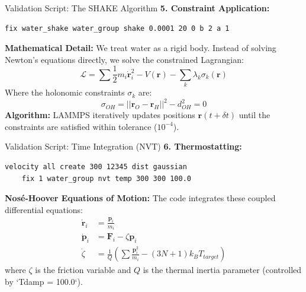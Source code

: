 \documentclass[aspectratio=169, 10pt]{beamer}
\begin{document}
\begin{frame}[fragile]{Validation Script: The SHAKE Algorithm}
    \textbf{5. Constraint Application:}
    \begin{lstlisting}[language=bash]
    fix water_shake water_group shake 0.0001 20 0 b 2 a 1
    \end{lstlisting}
    
    \textbf{Mathematical Detail:}
    We treat water as a rigid body. Instead of solving Newton's equations directly, we solve the constrained Lagrangian:
    \begin{equation}
        \mathcal{L} = \sum \frac{1}{2} m_i \dot{\mathbf{r}}_i^2 - V(\mathbf{r}) - \sum_{k} \lambda_k \sigma_k(\mathbf{r})
    \end{equation}
    Where the holonomic constraints $\sigma_k$ are:
    \begin{equation}
        \sigma_{OH} = ||\mathbf{r}_O - \mathbf{r}_H||^2 - d_{OH}^2 = 0
    \end{equation}
    \textbf{Algorithm:}
    LAMMPS iteratively updates positions $\mathbf{r}(t+\delta t)$ until the constraints are satisfied within tolerance ($10^{-4}$).
\end{frame}

\begin{frame}[fragile]{Validation Script: Time Integration (NVT)}
    \textbf{6. Thermostatting:}
    \begin{lstlisting}[language=bash]
    velocity all create 300 12345 dist gaussian
    fix 1 water_group nvt temp 300 300 100.0
    \end{lstlisting}

    \textbf{Nosé-Hoover Equations of Motion:}
    The code integrates these coupled differential equations:
    \begin{align}
        \dot{\mathbf{r}}_i &= \frac{\mathbf{p}_i}{m_i} \\
        \dot{\mathbf{p}}_i &= \mathbf{F}_i - \zeta \mathbf{p}_i \\
        \dot{\zeta} &= \frac{1}{Q} \left( \sum \frac{\mathbf{p}_i^2}{m_i} - (3N+1)k_B T_{target} \right)
    \end{align}
    where $\zeta$ is the friction variable and $Q$ is the thermal inertia parameter (controlled by `Tdamp = 100.0`).
\end{frame}
\end{document}
